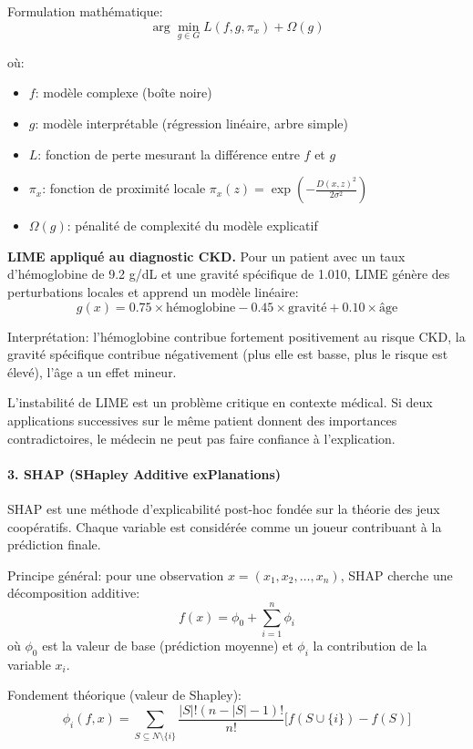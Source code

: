 Formulation mathématique:
\[
\arg\min_{g \in G} L(f, g, \pi_x) + \Omega(g)
\]

où:
\begin{itemize}
    \item $f$: modèle complexe (boîte noire)
    \item $g$: modèle interprétable (régression linéaire, arbre simple)
    \item $L$: fonction de perte mesurant la différence entre $f$ et $g$
    \item $\pi_x$: fonction de proximité locale $\pi_x(z) = \exp \left( - \frac{D(x,z)^2}{2\sigma^2} \right)$
    \item $\Omega(g)$: pénalité de complexité du modèle explicatif
\end{itemize}

\textbf{LIME appliqué au diagnostic CKD.}
Pour un patient avec un taux d'hémoglobine de 9.2 g/dL et une gravité spécifique de 1.010, LIME génère des perturbations locales et apprend un modèle linéaire:
\[
g(x) = 0.75 \times \text{hémoglobine} - 0.45 \times \text{gravité} + 0.10 \times \text{âge}
\]

Interprétation: l'hémoglobine contribue fortement positivement au risque CKD, la gravité spécifique contribue négativement (plus elle est basse, plus le risque est élevé), l'âge a un effet mineur.

\begin{attention}
L'instabilité de LIME est un problème critique en contexte médical. Si deux applications successives sur le même patient donnent des importances contradictoires, le médecin ne peut pas faire confiance à l'explication.
\end{attention}

\paragraph{3. SHAP (SHapley Additive exPlanations)}

SHAP est une méthode d’explicabilité post-hoc fondée sur la théorie des jeux coopératifs. Chaque variable est considérée comme un joueur contribuant à la prédiction finale.

Principe général: pour une observation $x = (x_1, x_2, \dots, x_n)$, SHAP cherche une décomposition additive:
\[
f(x) = \phi_0 + \sum_{i=1}^{n} \phi_i
\]
où $\phi_0$ est la valeur de base (prédiction moyenne) et $\phi_i$ la contribution de la variable $x_i$.

Fondement théorique (valeur de Shapley):
\[
\phi_i(f,x) = \sum_{S \subseteq N \setminus \{i\}} \frac{|S|! (n - |S| - 1)!}{n!} \big[ f(S \cup \{i\}) - f(S) \big]
\]

